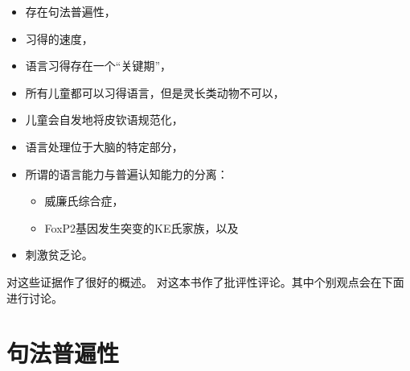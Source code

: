 \begin{itemize}
\item 存在句法普遍性，
\item 习得的速度，
\item 语言习得存在一个“关键期”，
\item 所有儿童都可以习得语言，但是灵长类动物不可以，
\item 儿童会自发地将皮钦语规范化，
\item 语言处理位于大脑的特定部分，
\item 所谓的语言能力与普遍认知能力的分离：
\begin{itemize}
\item 威廉氏综合症，
\item FoxP2基因发生突变的KE氏家族，以及
\end{itemize}
\item 刺激贫乏论。
\end{itemize}
 \citet{Pinker94a}对这些证据作了很好的概述。 \citet{Tomasello95a}对这本书作了批评性评论。其中个别观点会在下面进行讨论。

\section{句法普遍性}
\label{sec-syntactic-universals}

